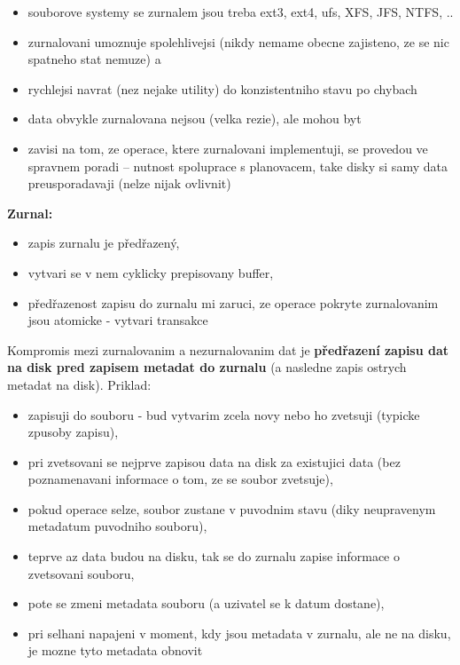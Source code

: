 \documentclass[a4paper, 11pt]{article}
\begin{document}
\begin{itemize}
    \item souborove systemy se zurnalem jsou treba ext3, ext4, ufs, XFS, JFS, NTFS, ..
    \item zurnalovani umoznuje spolehlivejsi (nikdy nemame obecne zajisteno, ze se nic spatneho stat nemuze) a     \item rychlejsi navrat (nez nejake utility) do konzistentniho stavu po chybach
    \item data obvykle zurnalovana nejsou (velka rezie), ale mohou byt
    \item zavisi na tom, ze operace, ktere zurnalovani implementuji, se provedou ve spravnem poradi -- nutnost spoluprace s planovacem, take disky si samy data preusporadavaji (nelze nijak ovlivnit) \\
\end{itemize}

\noindent\textbf{Zurnal:}
\begin{itemize}
    \item zapis zurnalu je p\v{r}ed\v{r}azen\'{y},
    \item vytvari se v nem cyklicky prepisovany buffer,
    \item p\v{r}ed\v{r}azenost zapisu do zurnalu mi zaruci, ze operace pokryte zurnalovanim jsou atomicke - vytvari transakce \\
\end{itemize}

Kompromis mezi zurnalovanim a nezurnalovanim dat je \textbf{p\v{r}ed\v{r}azen\'{i} zapisu dat na disk pred zapisem metadat do zurnalu} (a nasledne zapis ostrych metadat na disk). Priklad:
\begin{itemize}
    \item zapisuji do souboru - bud vytvarim zcela novy nebo ho zvetsuji (typicke zpusoby zapisu),
    \item pri zvetsovani se nejprve zapisou data na disk za existujici data (bez poznamenavani informace o tom, ze se soubor zvetsuje),
    \item pokud operace selze, soubor zustane v puvodnim stavu (diky neupravenym metadatum puvodniho souboru),
    \item teprve az data budou na disku, tak se do zurnalu zapise informace o zvetsovani souboru,
    \item pote se zmeni metadata souboru (a uzivatel se k datum dostane),
    \item pri selhani napajeni v moment, kdy jsou metadata v zurnalu, ale ne na disku, je mozne tyto metadata obnovit \\
\end{itemize}
\end{document}
